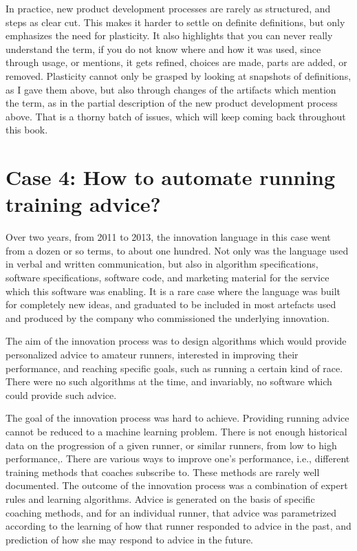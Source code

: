 \documentclass[graybox,envcountchap,sectrefs]{svmono}
\begin{document}
In practice, new product development processes are rarely as structured, and steps as clear cut.  This makes it harder to settle on definite definitions, but only emphasizes the need for plasticity. It also highlights that you can never really understand the term, if you do not know where and how it was used, since through usage, or mentions, it gets refined, choices are made, parts are added, or removed. Plasticity cannot only be grasped by looking at snapshots of definitions, as I gave them above, but also through changes of the artifacts which mention the term, as in the partial description of the new product development process above. That is a thorny batch of issues, which will keep coming back throughout this book.


\section{Case 4: How to automate running training advice?}
\label{c5:s5}
Over two years, from 2011 to 2013, the innovation language in this case went from a dozen or so terms, to about one hundred. Not only was the language used in verbal and written communication, but also in algorithm specifications, software specifications, software code, and marketing material for the service which this software was enabling. It is a rare case where the language was built for completely new ideas, and graduated to be included in most artefacts used and produced by the company who commissioned the underlying innovation.

The aim of the innovation process was to design algorithms which would provide personalized advice to amateur runners, interested in improving their performance, and reaching specific goals, such as running a certain kind of race. There were no such algorithms at the time, and invariably, no software which could provide such advice.

The goal of the innovation process was hard to achieve. Providing running advice cannot be reduced to a machine learning problem. There is not enough historical data on the progression of a given runner, or similar runners, from low to high performance,. There are various ways to improve one's performance, i.e., different training methods that coaches subscribe to. These methods are rarely well documented. The outcome of the innovation process was a combination of expert rules and learning algorithms. Advice is generated on the basis of specific coaching methods, and for an individual runner, that advice was parametrized according to the learning of how that runner responded to advice in the past, and prediction of how she may respond to advice in the future. 
\end{document}
